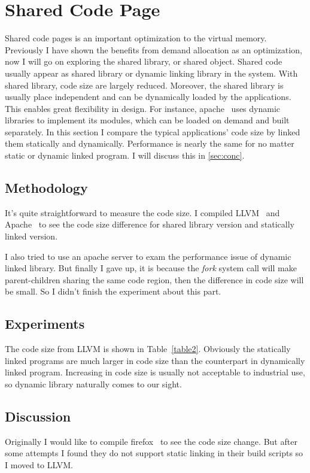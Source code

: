 \section{Shared Code Page}
	\label{sec:sharedobj}
Shared code pages is an important optimization to the virtual memory. Previously
I have shown the benefits from demand allocation as an optimization, now I will
go on exploring the shared library, or shared object.  Shared code usually
appear as shared library or dynamic linking library in the system.  With shared
library, code size are largely reduced.  Moreover, the shared library is
usually place independent and can be dynamically loaded by the applications.
This enables great flexibility in design. For instance, apache~\cite{apache}
uses dynamic libraries to implement its modules, which can be loaded on demand
and built separately. In this section I compare the typical applications' code
size by linked them statically and dynamically. Performance is nearly the 
same for no matter static or dynamic linked program. I will discuss this in
\ref{sec:conc}.

\subsection{Methodology}
It's quite straightforward to measure the code size. I compiled
LLVM~\cite{llvm} and Apache~\cite{apache} to see the code size difference for
shared library version and statically linked version.

I also tried to use an apache server to exam the performance issue of dynamic
linked library. But finally I gave up, it is because the \emph{fork} system
call will make parent-children sharing the same code region, then the difference
in code size will be small. So I didn't finish the experiment about this part.

\subsection{Experiments}
 The code size from LLVM is shown in Table~\ref{table2}. Obviously the statically
 linked programs are much larger in code size than the counterpart in
 dynamically linked program. Increasing in code size is usually not acceptable to industrial use, so
 dynamic library naturally comes to our sight.

\subsection{Discussion}
Originally I would like to compile firefox~\cite{firefox} to see the code size
change. But after some attempts I found they do not support static linking in their
build scripts so I moved to LLVM.

